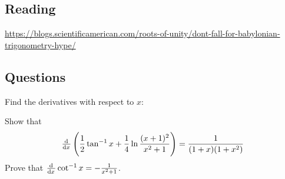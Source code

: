 


\subsection*{Reading}
\url{https://blogs.scientificamerican.com/roots-of-unity/dont-fall-for-babylonian-trigonometry-hype/}

\subsection*{Questions}
\begin{questions}
  \question Find the derivatives with respect to $ x $:
  \question Show that
    \begin{displaymath}
      \od{}{x} \left( \frac{1}{2} \tan^{-1} x + \frac{1}{4} \ln\frac{(x + 1)^2}{x^2 + 1} \right) = \frac{1}{(1 + x)(1 + x^2)}
    \end{displaymath}
  \question Prove that $ \od{}{x} \cot^{-1} x = -\frac{1}{x^2 + 1} $.
\end{questions}

